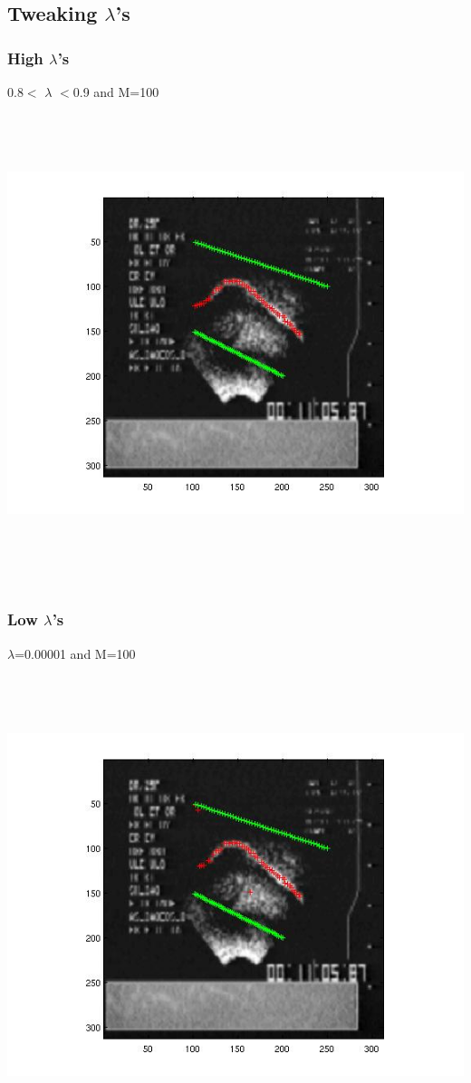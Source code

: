 \documentclass[12pt,a4paper,twocolumn]{article}
\begin{document}
\subsection{Tweaking $\lambda$'s}
\subsubsection{High $\lambda$'s}
0.8$<$ $\lambda$ $<$0.9 and M=100
\includegraphics[width=500pt,height=400pt,scale=1]{89.jpg}
\newpage
\mbox{}
\newpage
\subsubsection{Low $\lambda$'s}
$\lambda$=0.00001 and M=100
\includegraphics[width=500pt,height=400pt,scale=1]{small_values.jpg}
\newpage
\mbox{}
\newpage
\end{document}
